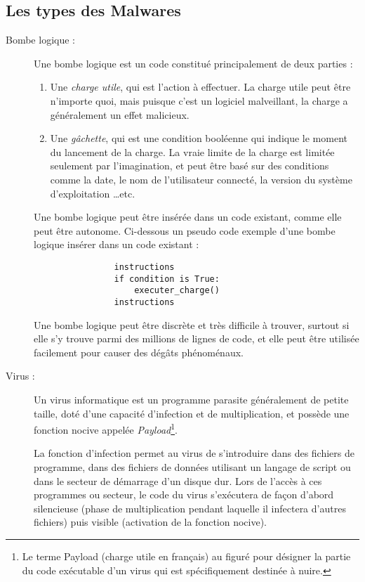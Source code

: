     \subsection{Les types des Malwares}
    \begin{description}
        \item[Bombe logique :] Une bombe logique est un code constitué principalement de deux parties :
            \begin{enumerate}
                \item Une \emph{charge utile}, qui est l'action à effectuer. La charge utile peut être n'importe quoi,
                    mais puisque c'est un logiciel malveillant, la charge a généralement un effet malicieux.
                \item Une \emph{gâchette}, qui est une condition booléenne qui indique le moment du lancement de la
                    charge. La vraie limite de la charge est limitée seulement par l'imagination, et peut être basé sur
                    des conditions comme la date, le nom de l'utilisateur connecté, la version du système d'exploitation
                    \ldots etc.
            \end{enumerate}
            Une bombe logique peut être insérée dans un code existant, comme elle peut être autonome. 
            Ci-dessous un pseudo code exemple d'une bombe logique insérer dans un code existant :
            \begin{verbatim}
                instructions
                if condition is True:
                    executer_charge()
                instructions
            \end{verbatim}
            Une bombe logique peut être discrète et très difficile à trouver, surtout si elle s'y trouve parmi des 
            millions de lignes de code, et elle peut être utilisée facilement pour causer des 
            dégâts phénoménaux. \cite{virus} %

        \item[Virus :] Un virus informatique est un programme parasite généralement de petite taille, 
            doté d’une capacité d’infection et de multiplication, et possède une fonction nocive appelée 
            \emph{Payload}\footnote{Le terme Payload (charge utile en français) au figuré pour désigner 
            la partie du code exécutable d'un virus qui est spécifiquement destinée à nuire.}.

            La fonction d'infection permet au virus de s'introduire dans des fichiers de programme, 
            dans des fichiers de données utilisant un langage de script ou dans le secteur de démarrage 
            d’un disque dur. Lors de l'accès à ces programmes ou secteur, le code du virus s'exécutera de 
            façon d'abord silencieuse (phase de multiplication pendant laquelle il infectera d'autres fichiers) 
            puis visible (activation de la fonction nocive).


\end{description}
